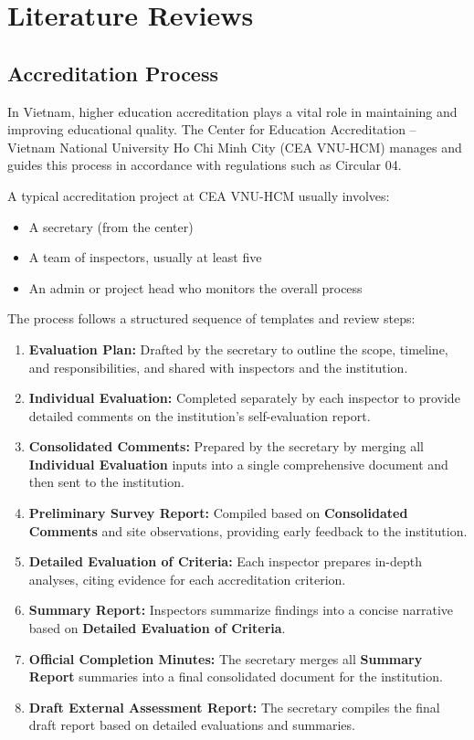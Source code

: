 
    \chapter{Literature Reviews}

\section{Accreditation Process}
In Vietnam, higher education accreditation plays a vital role in maintaining and improving educational quality. The Center for Education Accreditation – Vietnam National University Ho Chi Minh City (CEA VNU-HCM) manages and guides this process in accordance with regulations such as Circular 04.

A typical accreditation project at CEA VNU-HCM usually involves:
\begin{itemize}
    \item A secretary (from the center)
    \item A team of inspectors, usually at least five
    \item An admin or project head who monitors the overall process
\end{itemize}

The process follows a structured sequence of templates and review steps:

\begin{enumerate}
\label{sec:docdefs}
    \item \textbf{Evaluation Plan\label{doc:eval-plan}:} Drafted by the secretary to outline the scope, timeline, and responsibilities, and shared with inspectors and the institution.
    \item \textbf{Individual Evaluation\label{doc:indi-eval}:} Completed separately by each inspector to provide detailed comments on the institution’s self-evaluation report.
    \item \textbf{Consolidated Comments\label{doc:comments}:} Prepared by the secretary by merging all \textbf{Individual Evaluation} inputs into a single comprehensive document and then sent to the institution.
    \item \textbf{Preliminary Survey Report\label{doc:indi-eval}:} Compiled based on \textbf{Consolidated Comments} and site observations, providing early feedback to the institution.
    \item \textbf{Detailed Evaluation of Criteria\label{doc:criteria}:} Each inspector prepares in-depth analyses, citing evidence for each accreditation criterion.
    \item \textbf{Summary Report\label{doc:summary}:} Inspectors summarize findings into a concise narrative based on \textbf{Detailed Evaluation of Criteria}.
    \item \textbf{Official Completion Minutes\label{doc:official}:} The secretary merges all \textbf{Summary Report} summaries into a final consolidated document for the institution.
    \item \textbf{Draft External Assessment Report\label{doc:assest-report}:} The secretary compiles the final draft report based on detailed evaluations and summaries.
\end{enumerate}


